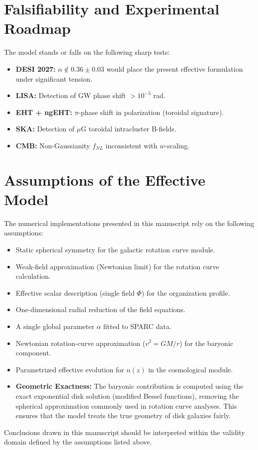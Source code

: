 \documentclass[12pt,a4paper]{article}
\numberwithin{equation}{section}
\begin{document}
\section{Falsifiability and Experimental Roadmap}

The model stands or falls on the following sharp tests:
\begin{itemize}
    \item \textbf{DESI 2027:} $\alpha \notin 0.36 \pm 0.03$ would place the present effective formulation under significant tension.
    \item \textbf{LISA:} Detection of GW phase shift $>10^{-5}$ rad.
    \item \textbf{EHT + ngEHT:} $\pi$-phase shift in polarization (toroidal signature).
    \item \textbf{SKA:} Detection of $\mu$G toroidal intracluster B-fields.
    \item \textbf{CMB:} Non-Gaussianity $f_{NL}$ inconsistent with $w$-scaling.
\end{itemize}

\section{Assumptions of the Effective Model}

The numerical implementations presented in this manuscript rely on the following assumptions:
\begin{itemize}
    \item Static spherical symmetry for the galactic rotation curve module.
    \item Weak-field approximation (Newtonian limit) for the rotation curve calculation.
    \item Effective scalar description (single field $\Phi$) for the organization profile.
    \item One-dimensional radial reduction of the field equations.
    \item A single global parameter $\alpha$ fitted to SPARC data.
    \item Newtonian rotation-curve approximation ($v^2 = GM/r$) for the baryonic component.
    \item Parametrized effective evolution for $n(z)$ in the cosmological module.
    \item \textbf{Geometric Exactness:} The baryonic contribution is computed using the exact exponential disk solution (modified Bessel functions), removing the spherical approximation commonly used in rotation curve analyses. This ensures that the model treats the true geometry of disk galaxies fairly.
\end{itemize}
Conclusions drawn in this manuscript should be interpreted within the validity domain defined by the assumptions listed above.
\end{document}
